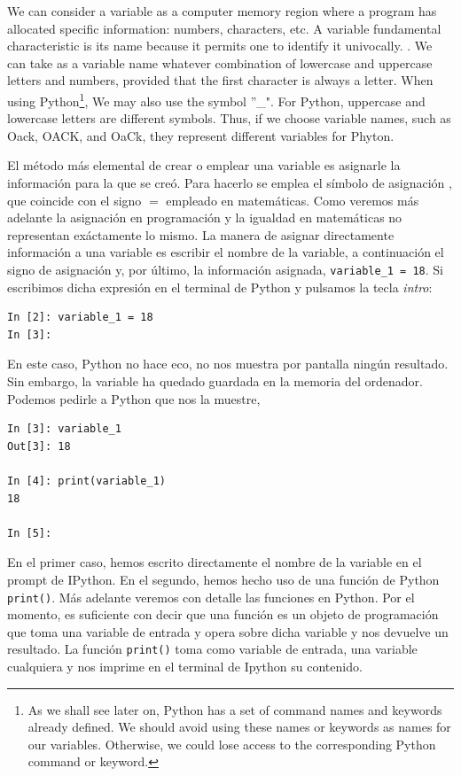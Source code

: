 \begin{paracol}{2}
\switchcolumn
We can consider a variable as a computer memory region where a program has allocated specific information: numbers, characters, etc. A variable fundamental characteristic is its name because it permits one to identify it univocally. . We can take as a variable name whatever combination of lowercase and uppercase letters and numbers, provided that the first character is always a letter. When using Python\footnote{As we shall see later on, Python has a set of command names and keywords already defined. We should avoid using these names or keywords as names for our variables. Otherwise, we could lose access to the corresponding Python command or keyword.}, We may also use the symbol ''\_". For Python, uppercase and lowercase letters are different symbols. Thus, if we choose variable names, such as Oack, OACK, and OaCk, they represent different variables for Phyton.

\switchcolumn
El método más elemental de crear o emplear una variable es asignarle la información para la que se creó. Para hacerlo se emplea el símbolo de asignación  , que coincide con el signo $=$ empleado en matemáticas. Como veremos más adelante la asignación en programación y la igualdad en matemáticas no representan exáctamente lo mismo. La manera de asignar directamente información a una variable es escribir el nombre de la variable, a continuación  el signo de asignación y, por último, la información asignada, \texttt{variable_1 = 18}. Si escribimos dicha expresión en el terminal de Py\-thon y pulsamos la tecla \emph{intro}:
\begin{verbatim}
In [2]: variable_1 = 18
In [3]:
\end{verbatim}
En este caso, Python no hace eco, no nos muestra por pantalla ningún resultado. Sin embargo, la variable ha quedado guardada en la memoria del ordenador. Podemos pedirle a Python que nos la muestre, 
\begin{verbatim}
In [3]: variable_1
Out[3]: 18

In [4]: print(variable_1)
18

In [5]: 
\end{verbatim}
En el primer caso, hemos escrito directamente el nombre de la variable en el prompt de IPython. En el segundo, hemos hecho uso de una función de Python \texttt{print()}. Más adelante veremos con detalle las funciones en Python. Por el momento, es suficiente con decir que una función es un objeto de programación que toma una variable de entrada y opera sobre dicha variable y nos devuelve un resultado. La  función \texttt{print()} toma como variable de entrada, una variable cualquiera y nos imprime en el terminal de Ipython su contenido.


\end{paracol}
